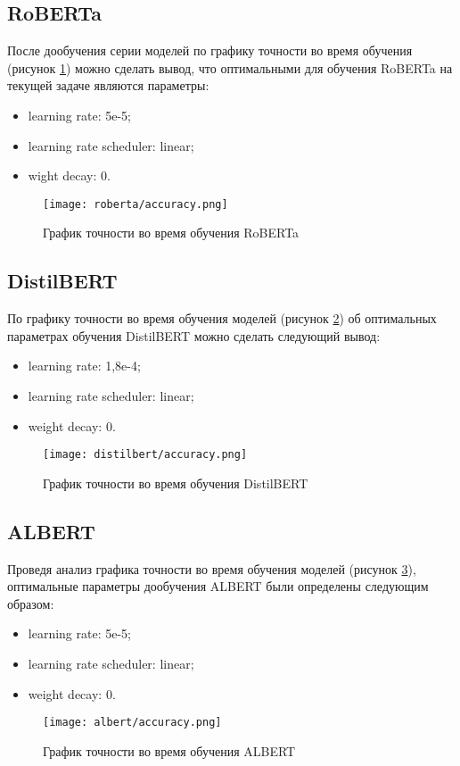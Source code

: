 \subsection{RoBERTa}
После дообучения серии моделей по графику точности во время обучения (рисунок \ref{roberta-accuracy:image}) можно сделать вывод, 
что оптимальными для обучения RoBERTa на текущей задаче являются параметры:
\begin{itemize}
    \item learning rate: 5e-5;
    \item learning rate scheduler: linear;
    \item wight decay: 0.
\end{itemize}
\begin{figure}[H]
    \begin{center}
       \texttt{[image: roberta/accuracy.png]}
       \caption{График точности во время обучения RoBERTa}
       \label{roberta-accuracy:image}
    \end{center}
\end{figure}

\subsection{DistilBERT}
По графику точности во время обучения моделей (рисунок \ref{distilbert-accuracy:image}) об оптимальных параметрах обучения DistilBERT
можно сделать следующий вывод:
\begin{itemize}
    \item learning rate: 1,8e-4;
    \item learning rate scheduler: linear;
    \item weight decay: 0.
\end{itemize}
\begin{figure}[H]
    \begin{center}
       \texttt{[image: distilbert/accuracy.png]}
       \caption{График точности во время обучения DistilBERT}
       \label{distilbert-accuracy:image}
    \end{center}
\end{figure}

\subsection{ALBERT}
Проведя анализ графика точности во время обучения моделей (рисунок \ref{albert-accuracy:image}), оптимальные параметры дообучения ALBERT были определены следующим образом:
\begin{itemize}
    \item learning rate: 5e-5;
    \item learning rate scheduler: linear;
    \item weight decay: 0.
\end{itemize}
\begin{figure}[H]
    \begin{center}
       \texttt{[image: albert/accuracy.png]}
       \caption{График точности во время обучения ALBERT}
       \label{albert-accuracy:image}
    \end{center}
\end{figure}

